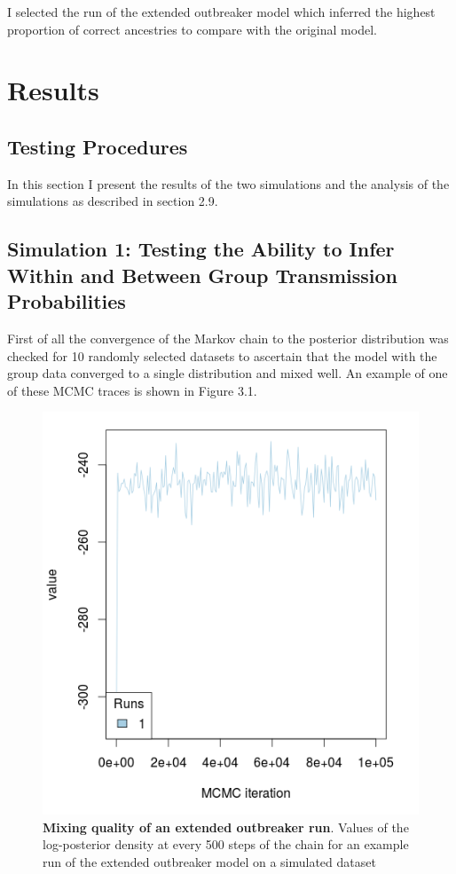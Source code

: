 \documentclass[11pt,a4paper]{report}
\begin{document}
I selected the run of the extended outbreaker model which inferred the highest proportion of correct ancestries to compare with the original model.

\chapter{Results}
\section{Testing Procedures}
In this section I present the results of the two simulations and the analysis of the simulations as described in section 2.9.
\section{Simulation 1: Testing the Ability to Infer Within and Between Group Transmission Probabilities}
First of all the convergence of the Markov chain to the posterior distribution was checked for 10 randomly selected datasets to ascertain that the model with the group data converged to a single distribution and mixed well. An example of one of these MCMC traces is shown in Figure 3.1.
\begin{figure}
\centering
\includegraphics[scale=0.6]{trace.png}
\newline
\caption{{\bf Mixing quality of an extended outbreaker run}. Values of the log-posterior density at every 500 steps of the chain for an example run of the extended outbreaker model on a simulated dataset}
\end{figure}
\end{document}
